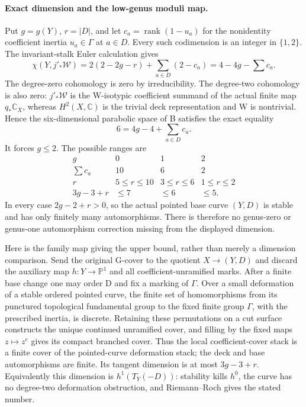 \paragraph{Exact dimension and the low-genus moduli map.}
Put \(g=g(Y)\), \(r=|D|\), and let
\(c_a=\operatorname{rank}(1-u_a)\) for the nonidentity
coefficient inertia \(u_a\in\Gamma\) at \(a\in D\).
Every such codimension is an integer in \(\{1,2\}\).
The invariant-stalk Euler calculation gives
\[
 \chi(Y,j'_*\mathcal W)
  =2(2-2g-r)+\sum_{a\in D}(2-c_a)
  =4-4g-\sum c_a.
\]
The degree-zero cohomology is zero by irreducibility. The degree-two
cohomology is also zero: \(j'_*\mathcal W\) is the W-isotypic
coefficient summand of the actual finite map \(q_*\mathbb C_X\),
whereas \(H^2(X,\mathbb C)\) is the trivial deck representation
and W is nontrivial. Hence the six-dimensional parabolic space of B
satisfies the exact equality
\begin{equation}\label{eq:S30-dimension}
                   6=4g-4+\sum_{a\in D}c_a.
\end{equation}
It forces \(g\le2\). The possible ranges are
\[
\begin{array}{c|ccc}
g&0&1&2\\\hline
\sum c_a&10&6&2\\
r&5\le r\le10&3\le r\le6&1\le r\le2\\
3g-3+r&\le7&\le6&\le5.
\end{array}
\]
In every case \(2g-2+r>0\), so the actual pointed base curve
\((Y,D)\) is stable and has only finitely many automorphisms.
There is therefore no genus-zero or genus-one automorphism correction
missing from the displayed dimension.

Here is the family map giving the upper bound, rather than merely a
dimension comparison. Send the original G-cover to the quotient
\(X\to(Y,D)\) and discard the auxiliary map \(h:Y\to
\mathbb P^1\) and all coefficient-unramified marks. After a finite
base change one may order D and fix a marking of \(\Gamma\).
Over a small deformation of a stable ordered pointed curve, the
finite set of homomorphisms from its punctured topological fundamental
group to the fixed finite group \(\Gamma\), with the prescribed
inertia, is discrete. Retaining these permutations on a cut surface
constructs the unique continued unramified cover, and filling by the
fixed maps \(z\mapsto z^e\) gives its compact branched cover.
Thus the local coefficient-cover stack is a finite cover of the
pointed-curve deformation stack; the deck and base automorphisms are
finite. Its tangent dimension is at most \(3g-3+r\).
Equivalently this dimension is \(h^1(T_Y(-D))\): stability
kills \(h^0\), the curve has no degree-two deformation obstruction,
and Riemann--Roch gives the stated number.

